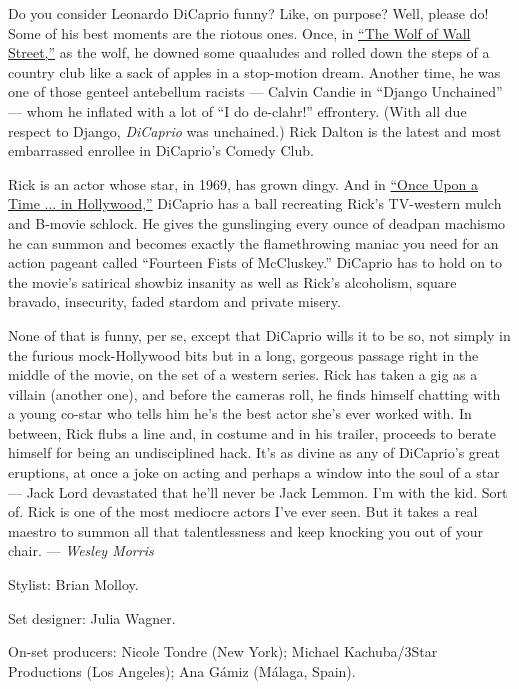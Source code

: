Do you consider Leonardo DiCaprio funny? Like, on purpose? Well, please
do! Some of his best moments are the riotous ones. Once, in
\href{https://www.nytimes3xbfgragh.onion/2013/12/25/movies/dicaprio-stars-in-scorseses-the-wolf-of-wall-street.html}{``The
Wolf of Wall Street,''} as the wolf, he downed some quaaludes and rolled
down the steps of a country club like a sack of apples in a stop-motion
dream. Another time, he was one of those genteel antebellum racists ---
Calvin Candie in ``Django Unchained'' --- whom he inflated with a lot of
``I do de-clahr!'' effrontery. (With all due respect to Django,
\emph{DiCaprio} was unchained.) Rick Dalton is the latest and most
embarrassed enrollee in DiCaprio's Comedy Club.

Rick is an actor whose star, in 1969, has grown dingy. And in
\href{https://www.nytimes3xbfgragh.onion/2019/07/24/movies/once-upon-a-time-in-hollywood-review.html}{``Once
Upon a Time ... in Hollywood,''} DiCaprio has a ball recreating Rick's
TV-western mulch and B-movie schlock. He gives the gunslinging every
ounce of deadpan machismo he can summon and becomes exactly the
flamethrowing maniac you need for an action pageant called ``Fourteen
Fists of McCluskey.'' DiCaprio has to hold on to the movie's satirical
showbiz insanity as well as Rick's alcoholism, square bravado,
insecurity, faded stardom and private misery.

None of that is funny, per se, except that DiCaprio wills it to be so,
not simply in the furious mock-Hollywood bits but in a long, gorgeous
passage right in the middle of the movie, on the set of a western
series. Rick has taken a gig as a villain (another one), and before the
cameras roll, he finds himself chatting with a young co-star who tells
him he's the best actor she's ever worked with. In between, Rick flubs a
line and, in costume and in his trailer, proceeds to berate himself for
being an undisciplined hack. It's as divine as any of DiCaprio's great
eruptions, at once a joke on acting and perhaps a window into the soul
of a star --- Jack Lord devastated that he'll never be Jack Lemmon. I'm
with the kid. Sort of. Rick is one of the most mediocre actors I've ever
seen. But it takes a real maestro to summon all that talentlessness and
keep knocking you out of your chair. --- \emph{Wesley Morris}

Stylist: Brian Molloy.

Set designer: Julia Wagner.

On-set producers: Nicole Tondre (New York); Michael Kachuba/3Star
Productions (Los Angeles); Ana Gámiz (Málaga, Spain).

